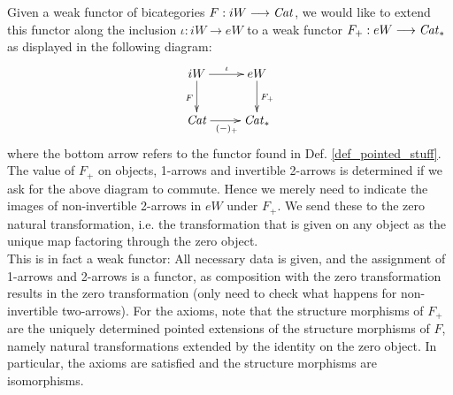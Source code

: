   \begin{defn}\label{def_extending_functor_iW_to_Cat_to_pointed_version}
    Given a weak functor of bicategories $F: iW \longrightarrow \mathit{Cat}$, we would like to extend this functor along the inclusion $\iota: iW \to eW$ to a weak functor $F_+: eW \longrightarrow \mathit{Cat}_*$ as displayed in the following diagram:
    \begin{displaymath}
      \xymatrix{
        iW
          \ar[d]_{F}
          \ar[r]^{\iota}
        &
        eW
          \ar[d]^{F_+}
        \\
        \Cat
          \ar[r]_{(-)_+}
        &
        \Cat_*
      }
    \end{displaymath}
    where the bottom arrow refers to the functor found in Def. \ref{def_pointed_stuff}.
    The value of $F_+$ on objects, 1-arrows and invertible 2-arrows is determined if we ask for the above diagram to commute.
    Hence we merely need to indicate the images of non-invertible 2-arrows in $eW$ under $F_+$.
    We send these to the zero natural transformation, i.e. the transformation that is given on any object as the unique map factoring through the zero object.\\
    This is in fact a weak functor: 
    All necessary data is given, and the assignment of 1-arrows and 2-arrows is a functor, as composition with the zero transformation results in the zero transformation (only need to check what happens for non-invertible two-arrows).
    For the axioms, note that the structure morphisms of $F_+$ are the uniquely determined pointed extensions of the structure morphisms of $F$, namely natural transformations extended by the identity on the zero object.
    In particular, the axioms are satisfied and the structure morphisms are isomorphisms.
  \end{defn}

